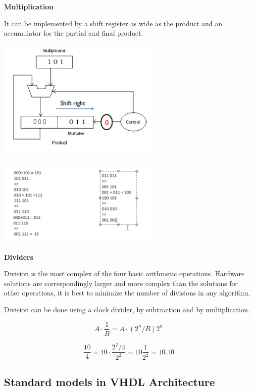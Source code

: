 \textbf{Multiplication}

It can be implemented by a shift register as wide as the product
and an accumulator for the partial and final product.

\begin{center}
	\includegraphics[width=0.6\textwidth]{images/multiplicationBlock.png}
\end{center}

\begin{center}
	\includegraphics[width=0.6\textwidth]{images/multiplication.png}
\end{center}




\textbf{Dividers}

Division is the most complex of the four basic arithmetic operations.
Hardware solutions are correspondingly larger and more complex
than the solutions for other operations, it is best to minimize the
number of divisions in any algorithm.

Division can be done using a clock divider, by subtraction
and by multiplication.

$$ A \cdot \frac{1}{B} = A \cdot (2^n/B)2^n$$

$$ \frac{10}{4} = 10 \cdot \frac{2^2/4}{2^2} = 10 \frac{1}{2^2} = 10.10$$




\subsection{Standard models in VHDL Architecture}


